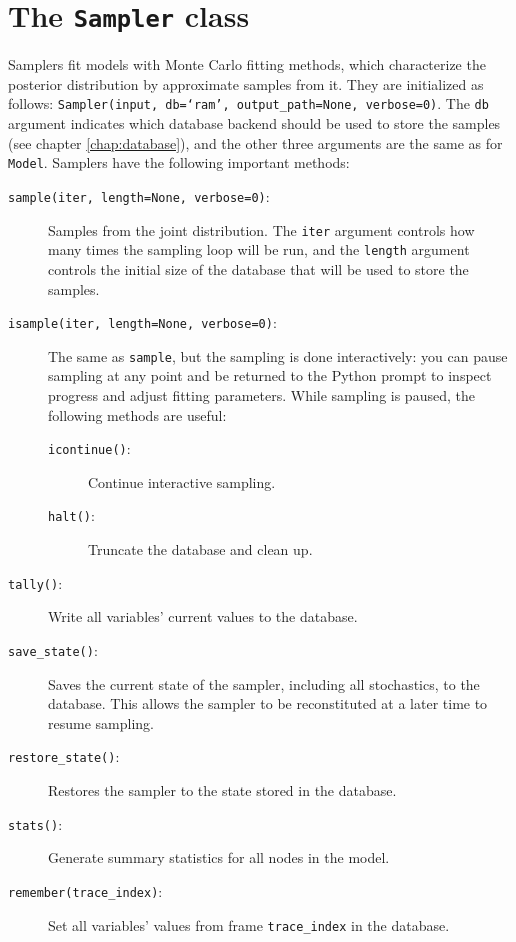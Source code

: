 \section*{The \texttt{Sampler} class} \label{sec:Sampler}
Samplers fit models with Monte Carlo fitting methods, which characterize the posterior distribution by approximate samples from it. They are initialized as follows: \texttt{Sampler(input, db=`ram', output\_path=None, verbose=0)}. The \texttt{db} argument indicates which database backend should be used to store the samples (see chapter \ref{chap:database}), and the other three arguments are the same as for \texttt{Model}. Samplers have the following important methods:
\begin{description}
    \item[\texttt{sample(iter, length=None, verbose=0)}:] Samples from the joint distribution. The \texttt{iter} argument controls how many times the sampling loop will be run, and the \texttt{length} argument controls the initial size of the database that will be used to store the samples.
    \item[\texttt{isample(iter, length=None, verbose=0)}:] The same as \texttt{sample}, but the sampling is done interactively: you can pause sampling at any point and be returned to the Python prompt to inspect progress and adjust fitting parameters. While sampling is paused, the following methods are useful: 
    \begin{description}
        \item[\texttt{icontinue()}:] Continue interactive sampling.
        \item[\texttt{halt()}:] Truncate the database and clean up.
    \end{description}
    \item[\texttt{tally()}:] Write all variables' current values to the database.
    \item[\texttt{save\_state()}:] Saves the current state of the sampler, including all stochastics, to the database. This allows the sampler to be reconstituted at a later time to resume sampling.
    \item[\texttt{restore\_state()}:] Restores the sampler to the state stored in the database.
	 \item[\texttt{stats()}:] Generate summary statistics for all nodes in the model.
    \item[\texttt{remember(trace\_index)}:] Set all variables' values from frame \texttt{trace\_index} in the database.
\end{description}

